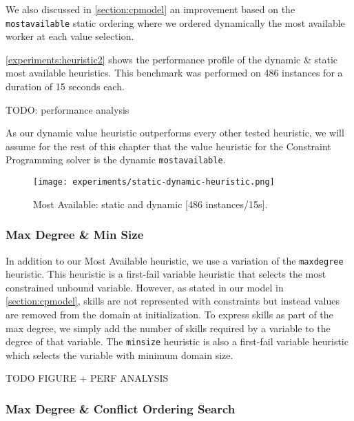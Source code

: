 \documentclass[../../thesis.tex]{subfiles}
\begin{document}
We also discussed in \autoref{section:cpmodel} an improvement based on the \texttt{mostavailable} static ordering
where we ordered dynamically the most available worker at each value selection.

\autoref{experiments:heuristic2} shows the performance profile of the dynamic \& static most available heuristics.
This benchmark was performed on 486 instances for a duration of 15 seconds each.

TODO: performance analysis



As our dynamic value heuristic outperforms every other tested heuristic, we will assume for the rest of this chapter 
that the value heuristic for the Constraint Programming solver is the dynamic \texttt{mostavailable}.



\begin{figure}
  \centering
  \texttt{[image: experiments/static-dynamic-heuristic.png]}
  \caption{Most Available: static and dynamic [486 instances/15s].}
  \label{experiments:heuristic2}
\end{figure}


\subsubsection{Max Degree \& Min Size}

In addition to our Most Available heuristic, we use a variation of the \texttt{maxdegree} heuristic. 
This heuristic is a first-fail variable heuristic that selects the most constrained unbound variable. However,
as stated in our model in \autoref{section:cpmodel}, skills are not represented with constraints but instead values 
are removed from the domain at initialization. To express skills as part of the max degree, we simply add the number of 
skills required by a variable to the degree of that variable. The \texttt{minsize} heuristic is also a first-fail variable heuristic which 
selects the variable with minimum domain size.

TODO FIGURE + PERF ANALYSIS 


\subsubsection{Max Degree \& Conflict Ordering Search}
\end{document}
